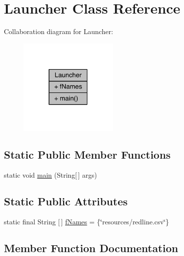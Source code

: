 \hypertarget{classLauncher}{}\section{Launcher Class Reference}
\label{classLauncher}


Collaboration diagram for Launcher\+:
\nopagebreak
\begin{figure}[H]
\begin{center}
\leavevmode
\includegraphics[width=139pt]{classLauncher__coll__graph}
\end{center}
\end{figure}
\subsection*{Static Public Member Functions}
\begin{DoxyCompactItemize}
\item 
static void \hyperlink{classLauncher_aa9770583b7ae34ee983017a915933f9f}{main} (String\mbox{[}$\,$\mbox{]} args)
\end{DoxyCompactItemize}
\subsection*{Static Public Attributes}
\begin{DoxyCompactItemize}
\item 
static final String \mbox{[}$\,$\mbox{]} \hyperlink{classLauncher_a87e12281d7d005f72571c3bbf569dbf2}{f\+Names} = \{\char`\"{}resources/redline.\+csv\char`\"{}\}
\end{DoxyCompactItemize}


\subsection{Member Function Documentation}
\mbox{\label{classLauncher_aa9770583b7ae34ee983017a915933f9f}} 
